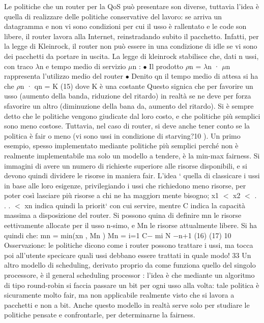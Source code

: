 Le politiche che un router per la QoS può presentare son diverse, tuttavia
l'idea è quella di realizzare delle politiche conservative del lavoro: se arriva un
datagramma e non vi sono condizioni per cui il usso è rallentato e le code son
libere, il router lavora alla Internet, reinstradando subito il pacchetto. Infatti,
per la legge di Kleinrock, il router non può essere in una condizione di idle se
vi sono dei pacchetti da portare in uscita. La legge di kleinrock stabilisce che,
dati n ussi, con traco $\lambda$n e tempo medio di servizio $\mu$n :
$\bullet$ Il prodotto $\rho$n = $\lambda$n · $\mu$n rappresenta l'utilizzo medio del router
$\bullet$ Denito qn il tempo medio di attesa si ha che
$\rho$n · qn = K
(15)
dove K è una costante
Questo signica che per favorire un usso (aumento della banda, riduzione del
ritardo) in realtà se ne deve per forza sfavorire un altro (diminuzione della bana
da, aumento del ritardo).
Si è sempre detto che le politiche vengono giudicate dal loro costo, e che
politiche più semplici sono meno costose. Tuttavia, nel caso di router, si deve
anche tener conto se la politica è fair o meno (vi sono ussi in condizione di
starving?10 ).
Un primo esempio, spesso implementato mediante politiche più semplici
perché non è realmente implementabile ma solo un modello a tendere, è la
min-max fairness. Si immagini di avere un numero di richieste superiore alle
risorse disponibili, e si devono quindi dividere le risorse in maniera fair. L'idea
` quella di classicare i ussi in base alle loro esigenze, privilegiando i ussi che
richiedono meno risorse, per poter così lasciare più risorse a chi ne ha maggior\i{}
mente bisogno; x1 $<$ x2 $<$ . . . $<$ xn indica quindi la priorit` con cui servire,
mentre C indica la capacità massima a disposizione del router. Si possono quina
di definire mn le risorse eettivamente allocate per il usso n-simo, e Mn le
risorse attualmente libere. Si ha quindi che:
mn = min(xn , Mn )
Mn =
i=1
C$-$
mi
N $-$n+1
(16)
(17)
10 Osservazione: le politiche dicono come i router possono trattare i ussi, ma tocca poi
all'utente specicare quali ussi debbano essere trattati in quale modo!
33
Un altro modello di scheduling, derivato proprio da come funziona quello del
singolo processore, è il general scheduling processor : l'idea è che mediante un
algoritmo di tipo round-robin si faccia passare un bit per ogni usso alla volta:
tale politica è sicuramente molto fair, ma non applicabile realmente visto che
si lavora a pacchetti e non a bit. Anche questo modello in realtà serve solo per
studiare le politiche pensate e confrontarle, per determinarne la fairness.
